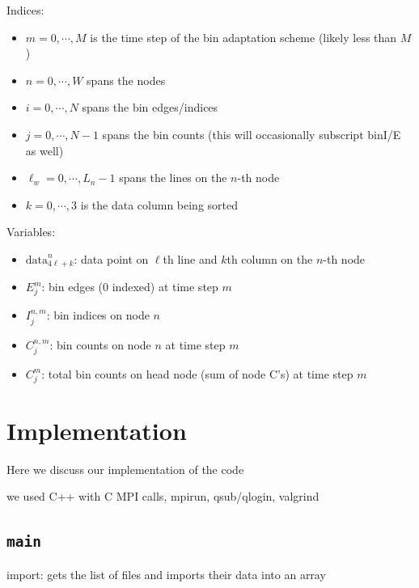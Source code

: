 \documentclass{article}
\begin{document}
\begin{mdframed}[backgroundcolor=blue!20]
	Indices:
	\setlength\itemsep{0.1pt}
	\setlength\parskip{0.1pt}
	\begin{itemize}
		\setlength\itemsep{0.1pt}
		\setlength\parskip{0.1pt}
		\item $m = 0, \cdots, M$ is the time step of the bin adaptation scheme (likely less than $M$)
		\item $n = 0, \cdots, W$ spans the nodes
		\item $i = 0, \cdots, N$ spans the bin edges/indices
		\item $j = 0, \cdots, N-1$ spans the bin counts (this will occasionally subscript binI/E as well)
		\item $\ell_w = 0, \cdots, L_n-1$ spans the lines on the $n$-th node
		\item $k = 0, \cdots, 3$ is the data column being sorted
	\end{itemize}
\end{mdframed}

\begin{mdframed}[backgroundcolor=blue!20]
	Variables:
	\setlength\itemsep{0.1pt}
	\setlength\parskip{0.1pt}
	\begin{itemize}
		\setlength\itemsep{0.1pt}
		\setlength\parskip{0.1pt}
		\item $\textrm{data}^n_{4\ell+k}$: data point on $\ell$th line and $k$th column on the $n$-th node
		\item ${E}^m_j$: bin edges (0 indexed) at time step $m$
		\item ${I}^{n,m}_j$: bin indices on node $n$
		\item ${C}^{n,m}_j$: bin counts on node $n$ at time step $m$
		\item ${C}^m_j$: total bin counts on head node (sum of node C's) at time step $m$
	\end{itemize}
\end{mdframed}


%
%

\section{Implementation}

Here we discuss our implementation of the code

we used C++ with C MPI calls, mpirun, qsub/qlogin, valgrind

\subsection{\texttt{main}}
import: gets the list of files and imports their data into an array
\end{document}
